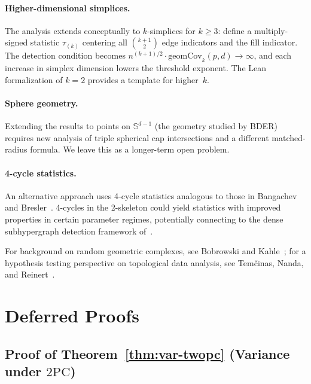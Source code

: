 \documentclass[reqno,12pt]{amsart}
\newcommand{\PC}{\mathrm{2PC}}
\newcommand{\geomCov}{\mathrm{geomCov}}
\newcommand{\Sph}{\mathbb{S}}
\theoremstyle{plain}
\theoremstyle{definition}
\theoremstyle{remark}
\begin{document}
\paragraph{Higher-dimensional simplices.}
The analysis extends conceptually to $k$-simplices for $k\geq 3$: define a multiply-signed
statistic $\tau_{(k)}$ centering all $\binom{k+1}{2}$ edge indicators and the fill indicator.
The detection condition becomes $n^{(k+1)/2}\cdot\geomCov_k(p,d)\to\infty$, and each
increase in simplex dimension lowers the threshold exponent. The Lean formalization of
$k=2$ provides a template for higher~$k$.

\paragraph{Sphere geometry.}
Extending the results to points on $\Sph^{d-1}$ (the geometry studied by BDER) requires
new analysis of triple spherical cap intersections and a different matched-radius formula.
We leave this as a longer-term open problem.

\paragraph{4-cycle statistics.}
An alternative approach uses 4-cycle statistics analogous to those in Bangachev and
Bresler~\cite{Bangachev2024}. 4-cycles in the 2-skeleton could yield statistics with
improved properties in certain parameter regimes, potentially connecting to the dense
subhypergraph detection framework of~\cite{Bangachev2024}.

For background on random geometric complexes, see Bobrowski and Kahle~\cite{Bobrowski2018};
for a hypothesis testing perspective on topological data analysis, see Tem\v{c}inas, Nanda,
and Reinert~\cite{Temcinas2025}.

\appendix
\section{Deferred Proofs}\label{app:proofs}

\subsection*{Proof of Theorem~\ref{thm:var-twopc} (Variance under \texorpdfstring{$\PC$}{2PC})}
\end{document}
